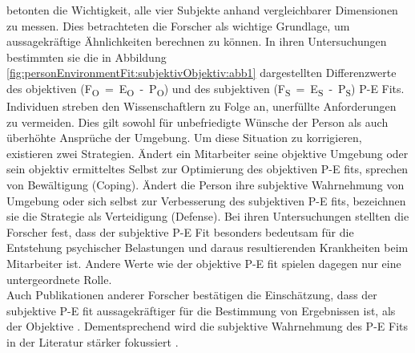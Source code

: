 \textcite{copingAndAdaption:1974} betonten die Wichtigkeit, alle vier Subjekte anhand vergleichbarer Dimensionen zu messen. Dies betrachteten die Forscher als wichtige Grundlage, um aussagekräftige Ähnlichkeiten berechnen zu können. In ihren Untersuchungen bestimmten sie die in Abbildung \ref{fig:personEnvironmentFit:subjektivObjektiv:abb1} dargestellten Differenzwerte des objektiven \mbox{(F\textsubscript{O} = E\textsubscript{O} - P\textsubscript{O})} und des subjektiven \mbox{(F\textsubscript{S} = E\textsubscript{S} - P\textsubscript{S})} P-E Fits. Individuen streben den Wissenschaftlern zu Folge an, unerfüllte Anforderungen zu vermeiden. Dies gilt sowohl für unbefriedigte Wünsche der Person als auch überhöhte Ansprüche der Umgebung. Um diese Situation zu korrigieren, existieren zwei Strategien. Ändert ein Mitarbeiter seine objektive Umgebung oder sein objektiv ermitteltes Selbst zur Optimierung des objektiven P-E fits, sprechen \textcite{copingAndAdaption:1974} von Bewältigung (Coping). Ändert die Person ihre subjektive Wahrnehmung von Umgebung oder sich selbst zur Verbesserung des subjektiven P-E fits, bezeichnen sie die Strategie als Verteidigung (Defense). Bei ihren Untersuchungen stellten die Forscher fest, dass der subjektive P-E Fit besonders bedeutsam für die Entstehung psychischer Belastungen und daraus resultierenden Krankheiten beim Mitarbeiter ist. Andere Werte wie der objektive P-E fit spielen dagegen nur eine untergeordnete Rolle. \\
Auch Publikationen anderer Forscher bestätigen die Einschätzung, dass der subjektive P-E fit aussagekräftiger für die Bestimmung von Ergebnissen ist, als der Objektive \cite[S. 3]{carless:2005}. Dementsprechend wird die subjektive Wahrnehmung des P-E Fits in der Literatur stärker fokussiert \cite[S. 8]{caplan:1987}\cite[S. 9]{caplan:1993}\cite[S. 16]{choi:2004}.\\
